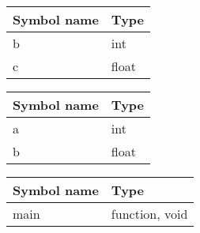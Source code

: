 \documentclass[paper=a4, fontsize=11pt]{scrartcl} %
\numberwithin{equation}{section} %
\numberwithin{figure}{section} %
\numberwithin{table}{section} %
\begin{document}
\begin{table}[ht!]
    \center
    \begin{tabular}{|l|l|}
    \hline
    Symbol name & Type           \\ \hline
    b        & int \\ \hline
    c        & float \\ \hline
    \end{tabular}
\end{table}

\begin{table}[ht!]
    \center
    \begin{tabular}{|l|l|}
    \hline
    Symbol name & Type           \\ \hline
    a        & int   \\ \hline
    b        & float \\ \hline
    \end{tabular}
\end{table}

\begin{table}[ht!]
    \center
    \begin{tabular}{|l|l|}
    \hline
    Symbol name & Type           \\ \hline
    main        & function, void \\ \hline
    \end{tabular}
\end{table}


\end{document}
